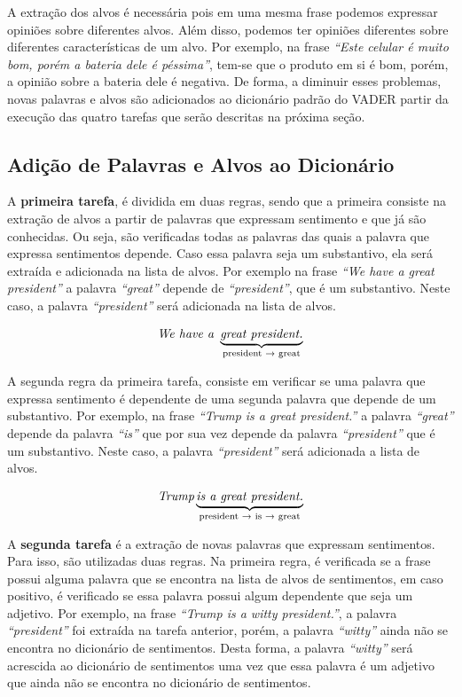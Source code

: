 A extração dos alvos é necessária pois em uma mesma frase
podemos expressar opiniões sobre diferentes alvos. Além disso, podemos
ter opiniões diferentes sobre diferentes características de um alvo. Por
exemplo, na frase \textit{``Este celular é muito bom, porém a bateria dele é
péssima''}, tem-se que o produto em si é bom, porém, a opinião sobre a bateria
dele é negativa. De forma, a diminuir esses problemas, novas palavras e alvos
são adicionados ao dicionário padrão do \ac{VADER} partir da execução das quatro
tarefas que serão descritas na próxima seção.

\subsection{Adição de Palavras e Alvos ao Dicionário}

A \textbf{primeira tarefa}, é dividida em duas regras, sendo que a primeira
consiste na extração de alvos a partir de palavras que expressam sentimento e
que já são conhecidas. Ou seja, são verificadas todas as palavras das quais a palavra que
expressa sentimentos depende. Caso essa palavra seja um substantivo, ela será
extraída e adicionada na lista de alvos. Por exemplo na frase \textit{``We have
a great president''} a palavra \textit{``great''} depende de \textit{``president''}, que é um substantivo. Neste caso, a palavra \textit{``president''} será adicionada na lista de alvos.

\[\textit{We have a } \underbrace{\textit{great president.}}_\text{president
\textrightarrow \text{ great}}\]

A segunda regra da primeira tarefa,
consiste em verificar se uma palavra que expressa sentimento é dependente de
uma segunda palavra que depende de um substantivo.
Por exemplo, na frase \textit{``Trump is a great president.''} a palavra
\textit{``great''} depende da palavra \textit{``is''} que por sua vez depende da
palavra \textit{``president''} que é um substantivo. Neste caso, a palavra
\textit{``president''} será adicionada a lista de alvos.

\[\textit{Trump} \underbrace{\textit{is a great president.}}_\text{president
\textrightarrow \text{ is} \textrightarrow \text{ great}}\]

A \textbf{segunda tarefa} é a extração de novas palavras que expressam
sentimentos. Para isso, são utilizadas duas regras. Na primeira regra, é
verificada se a frase possui alguma palavra que se encontra na lista de alvos de
sentimentos, em caso positivo, é verificado se essa palavra possui algum dependente que seja um adjetivo. Por exemplo, na frase \textit{``Trump is a witty president.''}, a palavra \textit{``president''} foi
extraída na tarefa anterior, porém, a palavra \textit{``witty''} ainda não se
encontra no dicionário de sentimentos.
Desta forma, a palavra \textit{``witty''} será acrescida ao
dicionário de sentimentos uma vez que essa palavra é um adjetivo que
ainda não se encontra no dicionário de sentimentos.


